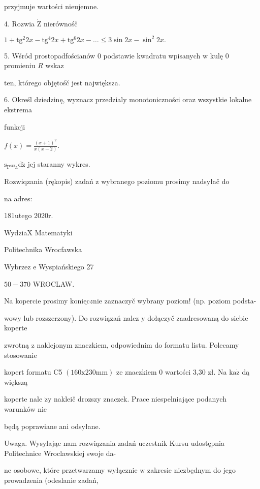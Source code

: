 \documentclass[a4paper,12pt]{article}
\begin{document}
przyjmuje wartości nieujemne.

4. Rozwia $\dot{\mathrm{Z}}$ nierównośč

$1+\mathrm{t}\mathrm{g}^{2}2x-\mathrm{t}\mathrm{g}^{4}2x+\mathrm{t}\mathrm{g}^{6}2x-\ldots\leq 3\sin 2x-\sin^{2}2x.$

5. Wśród prostopadfościanów $0$ podstawie kwadratu wpisanych $\mathrm{w}$ kulę $0$ promieniu $R$ wskaz

ten, którego objętośč jest największa.

6. Określ dziedzinę, wyznacz przedzialy monotoniczności oraz wszystkie lokalne ekstrema

funkcji

$f(x)=\displaystyle \frac{(x+1)^{2}}{x(x-2)}.$

$\mathrm{s}_{\mathrm{P}^{\mathrm{o}\mathrm{r}\mathrm{z}}\mathrm{a}}\mathrm{d}\acute{\mathrm{z}}$ jej staranny wykres.

Rozwiqzania (rękopis) zadań z wybranego poziomu prosimy nadsyłač do

na adres:

181utego 2020r.

WydziaX Matematyki

Politechnika Wrocfawska

Wybrzez $\mathrm{e}$ Wyspiańskiego 27

$50-370$ WROCLAW.

Na kopercie prosimy $\underline{\mathrm{k}\mathrm{o}\mathrm{n}\mathrm{i}\mathrm{e}\mathrm{c}z\mathrm{n}\mathrm{i}\mathrm{e}}$ zaznaczyč wybrany poziom! (np. poziom podsta-

wowy lub rozszerzony). Do rozwiązań nalez $\mathrm{y}$ dołączyč zaadresowaną do siebie koperte

zwrotną $\mathrm{z}$ naklejonym znaczkiem, odpowiednim do formatu listu. Polecamy stosowanie

kopert formatu C5 $(160\mathrm{x}230\mathrm{m}\mathrm{m})$ ze znaczkiem $0$ wartości 3,30 zł. Na $\mathrm{k}\mathrm{a}\dot{\mathrm{z}}$ dą większą

koperte nale $\dot{\mathrm{z}}\mathrm{y}$ nakleič drozszy znaczek. Prace niespelniające podanych warunków nie

będą poprawiane ani odsyłane.

Uwaga. Wysylając nam rozwiązania zadań uczestnik Kursu udostępnia Politechnice Wroclawskiej swoje da-

ne osobowe, które przetwarzamy wyłącznie $\mathrm{w}$ zakresie niezbędnym do jego prowadzenia (odeslanie zadań,
\end{document}
